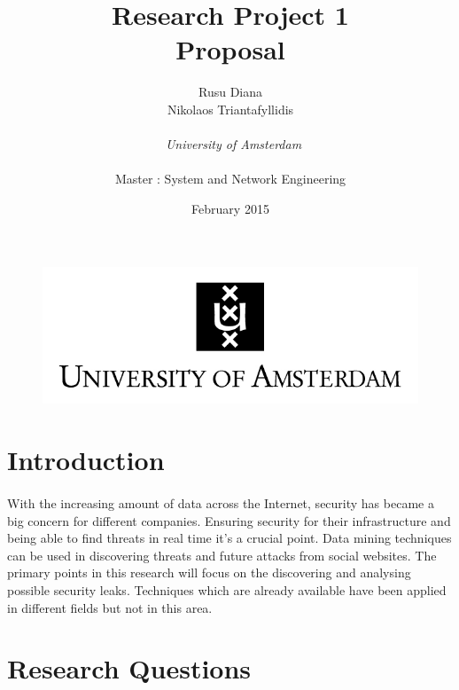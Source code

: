 \documentclass[11pt]{report}
\begin{document}
\begin{figure}[!t]
\centering
\includegraphics{images/uva.jpeg}
\end{figure}
\title{\textbf{Research Project 1 
} \\ Proposal}
\author{Rusu Diana \\ Nikolaos Triantafyllidis\\ \\
~\emph{University of Amsterdam 
        } \\ \\Master : System and Network Engineering}


\date{February 2015}

\maketitle

\tableofcontents

\newpage

\section*{Introduction}
\paragraph{}
With the increasing amount of data across the Internet, security has became a big concern for different companies. Ensuring security for their infrastructure and being able to find threats in real time it's a crucial point. Data mining techniques can be used in discovering threats and future attacks from social websites. The primary points in this research will focus on the discovering and analysing possible security leaks. Techniques which are already available have been applied in different fields but not in this area.

\section*{Research Questions}
\end{document}
